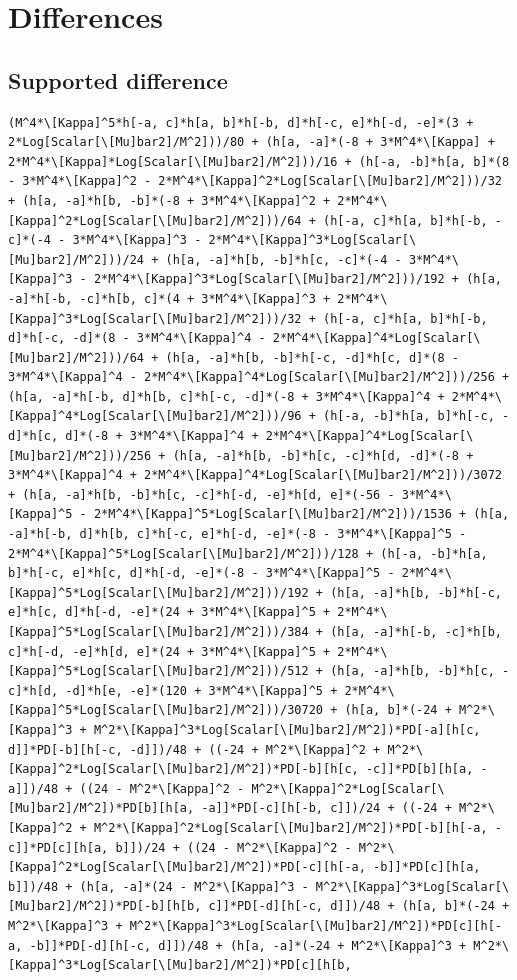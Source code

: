 \documentclass[11pt]{article}
\begin{document}
\section{Differences}
\subsection{Supported difference}
\begin{verbatim}
(M^4*\[Kappa]^5*h[-a, c]*h[a, b]*h[-b, d]*h[-c, e]*h[-d, -e]*(3 + 2*Log[Scalar[\[Mu]bar2]/M^2]))/80 + (h[a, -a]*(-8 + 3*M^4*\[Kappa] + 2*M^4*\[Kappa]*Log[Scalar[\[Mu]bar2]/M^2]))/16 + (h[-a, -b]*h[a, b]*(8 - 3*M^4*\[Kappa]^2 - 2*M^4*\[Kappa]^2*Log[Scalar[\[Mu]bar2]/M^2]))/32 + (h[a, -a]*h[b, -b]*(-8 + 3*M^4*\[Kappa]^2 + 2*M^4*\[Kappa]^2*Log[Scalar[\[Mu]bar2]/M^2]))/64 + (h[-a, c]*h[a, b]*h[-b, -c]*(-4 - 3*M^4*\[Kappa]^3 - 2*M^4*\[Kappa]^3*Log[Scalar[\[Mu]bar2]/M^2]))/24 + (h[a, -a]*h[b, -b]*h[c, -c]*(-4 - 3*M^4*\[Kappa]^3 - 2*M^4*\[Kappa]^3*Log[Scalar[\[Mu]bar2]/M^2]))/192 + (h[a, -a]*h[-b, -c]*h[b, c]*(4 + 3*M^4*\[Kappa]^3 + 2*M^4*\[Kappa]^3*Log[Scalar[\[Mu]bar2]/M^2]))/32 + (h[-a, c]*h[a, b]*h[-b, d]*h[-c, -d]*(8 - 3*M^4*\[Kappa]^4 - 2*M^4*\[Kappa]^4*Log[Scalar[\[Mu]bar2]/M^2]))/64 + (h[a, -a]*h[b, -b]*h[-c, -d]*h[c, d]*(8 - 3*M^4*\[Kappa]^4 - 2*M^4*\[Kappa]^4*Log[Scalar[\[Mu]bar2]/M^2]))/256 + (h[a, -a]*h[-b, d]*h[b, c]*h[-c, -d]*(-8 + 3*M^4*\[Kappa]^4 + 2*M^4*\[Kappa]^4*Log[Scalar[\[Mu]bar2]/M^2]))/96 + (h[-a, -b]*h[a, b]*h[-c, -d]*h[c, d]*(-8 + 3*M^4*\[Kappa]^4 + 2*M^4*\[Kappa]^4*Log[Scalar[\[Mu]bar2]/M^2]))/256 + (h[a, -a]*h[b, -b]*h[c, -c]*h[d, -d]*(-8 + 3*M^4*\[Kappa]^4 + 2*M^4*\[Kappa]^4*Log[Scalar[\[Mu]bar2]/M^2]))/3072 + (h[a, -a]*h[b, -b]*h[c, -c]*h[-d, -e]*h[d, e]*(-56 - 3*M^4*\[Kappa]^5 - 2*M^4*\[Kappa]^5*Log[Scalar[\[Mu]bar2]/M^2]))/1536 + (h[a, -a]*h[-b, d]*h[b, c]*h[-c, e]*h[-d, -e]*(-8 - 3*M^4*\[Kappa]^5 - 2*M^4*\[Kappa]^5*Log[Scalar[\[Mu]bar2]/M^2]))/128 + (h[-a, -b]*h[a, b]*h[-c, e]*h[c, d]*h[-d, -e]*(-8 - 3*M^4*\[Kappa]^5 - 2*M^4*\[Kappa]^5*Log[Scalar[\[Mu]bar2]/M^2]))/192 + (h[a, -a]*h[b, -b]*h[-c, e]*h[c, d]*h[-d, -e]*(24 + 3*M^4*\[Kappa]^5 + 2*M^4*\[Kappa]^5*Log[Scalar[\[Mu]bar2]/M^2]))/384 + (h[a, -a]*h[-b, -c]*h[b, c]*h[-d, -e]*h[d, e]*(24 + 3*M^4*\[Kappa]^5 + 2*M^4*\[Kappa]^5*Log[Scalar[\[Mu]bar2]/M^2]))/512 + (h[a, -a]*h[b, -b]*h[c, -c]*h[d, -d]*h[e, -e]*(120 + 3*M^4*\[Kappa]^5 + 2*M^4*\[Kappa]^5*Log[Scalar[\[Mu]bar2]/M^2]))/30720 + (h[a, b]*(-24 + M^2*\[Kappa]^3 + M^2*\[Kappa]^3*Log[Scalar[\[Mu]bar2]/M^2])*PD[-a][h[c, d]]*PD[-b][h[-c, -d]])/48 + ((-24 + M^2*\[Kappa]^2 + M^2*\[Kappa]^2*Log[Scalar[\[Mu]bar2]/M^2])*PD[-b][h[c, -c]]*PD[b][h[a, -a]])/48 + ((24 - M^2*\[Kappa]^2 - M^2*\[Kappa]^2*Log[Scalar[\[Mu]bar2]/M^2])*PD[b][h[a, -a]]*PD[-c][h[-b, c]])/24 + ((-24 + M^2*\[Kappa]^2 + M^2*\[Kappa]^2*Log[Scalar[\[Mu]bar2]/M^2])*PD[-b][h[-a, -c]]*PD[c][h[a, b]])/24 + ((24 - M^2*\[Kappa]^2 - M^2*\[Kappa]^2*Log[Scalar[\[Mu]bar2]/M^2])*PD[-c][h[-a, -b]]*PD[c][h[a, b]])/48 + (h[a, -a]*(24 - M^2*\[Kappa]^3 - M^2*\[Kappa]^3*Log[Scalar[\[Mu]bar2]/M^2])*PD[-b][h[b, c]]*PD[-d][h[-c, d]])/48 + (h[a, b]*(-24 + M^2*\[Kappa]^3 + M^2*\[Kappa]^3*Log[Scalar[\[Mu]bar2]/M^2])*PD[c][h[-a, -b]]*PD[-d][h[-c, d]])/48 + (h[a, -a]*(-24 + M^2*\[Kappa]^3 + M^2*\[Kappa]^3*Log[Scalar[\[Mu]bar2]/M^2])*PD[c][h[b, 
\end{verbatim}
\end{document}

